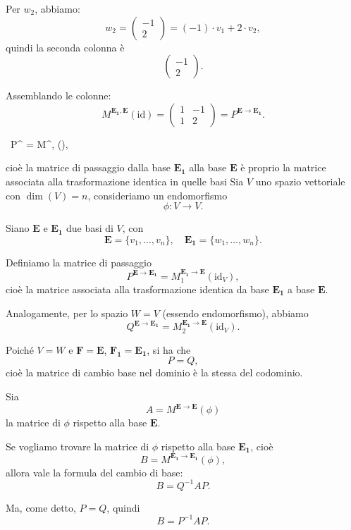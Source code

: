 \documentclass[12pt,a4paper]{article}
\begin{document}
Per \( w_2 \), abbiamo:
\[
w_2 = \begin{pmatrix} -1 \\ 2 \end{pmatrix} = (-1) \cdot v_1 + 2 \cdot v_2,
\]
quindi la seconda colonna è
\[
\begin{pmatrix} -1 \\ 2 \end{pmatrix}.
\]

\vspace{0.3cm}
Assemblando le colonne:
\[
M^{\bm{E_1}, \bm{E}}(\mathrm{id}) = \begin{pmatrix} 1 & -1 \\ 1 & 2 \end{pmatrix} = P^{\bm{E} \to \bm{E_1}}.
\]

\vspace{0.3cm}
\
P^{ \to {}} = M^{, }(),

\]
cioè la matrice di passaggio dalla base \(\bm{E_1}\) alla base \(\bm{E}\) è proprio la matrice associata alla trasformazione identica in quelle basi
\vspace{1em}
\hline
\vspace{1em}
Sia \( V \) uno spazio vettoriale con \(\dim(V) = n\), consideriamo un endomorfismo
\[
\phi : V \to V.
\]

Siano \( \bm{E} \) e \( \bm{E_1} \) due basi di \( V \), con
\[
\bm{E} = \{ v_1, \ldots, v_n \}, \quad \bm{E_1} = \{ w_1, \ldots, w_n \}.
\]

Definiamo la matrice di passaggio
\[
P^{\bm{E} \to \bm{E_1}} = M_1^{\bm{E_1} \to \bm{E}}(\mathrm{id}_V),
\]
cioè la matrice associata alla trasformazione identica da base \(\bm{E_1}\) a base \(\bm{E}\).

Analogamente, per lo spazio \( W = V \) (essendo endomorfismo), abbiamo
\[
Q^{\bm{E} \to \bm{E_1}} = M_2^{\bm{E_1} \to \bm{E}}(\mathrm{id}_V).
\]

Poiché \( V = W \) e \( \bm{F} = \bm{E} \), \( \bm{F_1} = \bm{E_1} \), si ha che
\[
P = Q,
\]
cioè la matrice di cambio base nel dominio è la stessa del codominio.

Sia
\[
A = M^{\bm{E} \to \bm{E}}(\phi)
\]
la matrice di \(\phi\) rispetto alla base \(\bm{E}\).

Se vogliamo trovare la matrice di \(\phi\) rispetto alla base \(\bm{E_1}\), cioè
\[
B = M^{\bm{E_1} \to \bm{E_1}}(\phi),
\]
allora vale la formula del cambio di base:
\[
\boxed{
B = Q^{-1} A P.
}
\]

Ma, come detto, \( P = Q \), quindi
\[
\boxed{
B = P^{-1} A P.
}
\]
\end{document}

